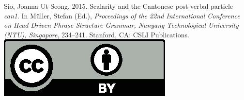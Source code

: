 \documentclass[11pt,a4paper,fleqn]{article}
\begin{document}
\noindent



\vfill
\noindent
Sio, Joanna Ut-Seong. 2015. Scalarity and the Cantonese post-verbal
particle \emph{can1}. In Müller, Stefan (Ed.), \emph{{Proceedings of the 22nd International Conference on Head-Driven Phrase Structure Grammar, Nanyang Technological University (NTU), Singapore}}, 234--241. Stanford,
CA: CSLI Publications. \hfill\href{http://creativecommons.org/licenses/by/4.0/}{\includegraphics[height=.75em]{Includes/ccby.eps}}

\newpage

\end{document}
